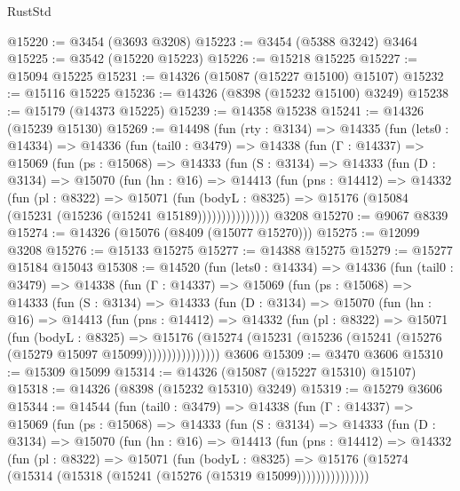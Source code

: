 \begin{lexlean}{RustStd}
\begin{coremodule}
@15220 := @3454 (@3693 @3208)
@15223 := @3454 (@5388 @3242) @3464
@15225 := @3542 (@15220 @15223)
@15226 := @15218 @15225
@15227 := @15094 @15225
@15231 := @14326 (@15087 (@15227 @15100) @15107)
@15232 := @15116 @15225
@15236 := @14326 (@8398 (@15232 @15100) @3249)
@15238 := @15179 (@14373 @15225)
@15239 := @14358 @15238
@15241 := @14326 (@15239 @15130)
@15269 := @14498
    (fun (rty : @3134) =>
    @14335
      (fun (lets0 : @14334) =>
      @14336
        (fun (tail0 : @3479) =>
        @14338
          (fun (Γ : @14337) =>
          @15069
            (fun (ps : @15068) =>
            @14333
              (fun (S : @3134) =>
              @14333
                (fun (D : @3134) =>
                @15070
                  (fun (hn : @16) =>
                  @14413
                    (fun (pns : @14412) =>
                    @14332
                      (fun (pl : @8322) =>
                      @15071
                        (fun (bodyL : @8325) =>
                        @15176 (@15084 (@15231 (@15236 (@15241 @15189)))))))))))))))
    @3208
@15270 := @9067 @8339
@15274 := @14326 (@15076 (@8409 (@15077 @15270)))
@15275 := @12099 @3208
@15276 := @15133 @15275
@15277 := @14388 @15275
@15279 := @15277 @15184 @15043
@15308 := @14520
    (fun (lets0 : @14334) =>
    @14336
      (fun (tail0 : @3479) =>
      @14338
        (fun (Γ : @14337) =>
        @15069
          (fun (ps : @15068) =>
          @14333
            (fun (S : @3134) =>
            @14333
              (fun (D : @3134) =>
              @15070
                (fun (hn : @16) =>
                @14413
                  (fun (pns : @14412) =>
                  @14332
                    (fun (pl : @8322) =>
                    @15071
                      (fun (bodyL : @8325) =>
                      @15176
                        (@15274
                          (@15231 (@15236 (@15241 (@15276 (@15279 @15097 @15099))))))))))))))))
    @3606
@15309 := @3470 @3606
@15310 := @15309 @15099
@15314 := @14326 (@15087 (@15227 @15310) @15107)
@15318 := @14326 (@8398 (@15232 @15310) @3249)
@15319 := @15279 @3606
@15344 := @14544
    (fun (tail0 : @3479) =>
    @14338
      (fun (Γ : @14337) =>
      @15069
        (fun (ps : @15068) =>
        @14333
          (fun (S : @3134) =>
          @14333
            (fun (D : @3134) =>
            @15070
              (fun (hn : @16) =>
              @14413
                (fun (pns : @14412) =>
                @14332
                  (fun (pl : @8322) =>
                  @15071
                    (fun (bodyL : @8325) =>
                    @15176 (@15274 (@15314 (@15318 (@15241 (@15276 (@15319 @15099)))))))))))))))

\end{coremodule}
\end{lexlean}
